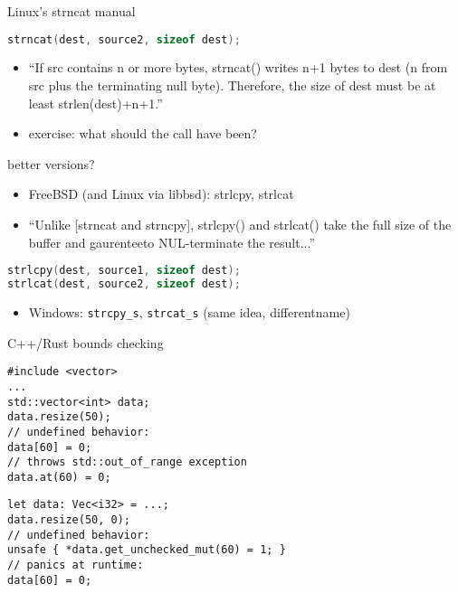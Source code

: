 \begin{frame}[fragile,label=strncatManual]{Linux's strncat manual}
\begin{lstlisting}[language=C,style=smaller]
strncat(dest, source2, sizeof dest);
\end{lstlisting}
\begin{itemize}
\item ``If src contains n or more bytes, strncat() writes n+1 bytes to  dest  (n
from  src  plus the terminating null byte).  Therefore, the size of dest
must be at least strlen(dest)+n+1.''
\end{itemize}
\begin{itemize}
\item exercise: what should the call have been?
\end{itemize}
\end{frame}

\begin{frame}[fragile,label=betterStrX]{better versions?}
\begin{itemize}
\item FreeBSD (and Linux via libbsd): strlcpy, strlcat
\item ``Unlike [strncat and strncpy], strlcpy() and strlcat() take the full size of the buffer
        and gaurenteeto NUL-terminate the result...''
\end{itemize}
\begin{lstlisting}[language=C++,style=smaller]
strlcpy(dest, source1, sizeof dest);
strlcat(dest, source2, sizeof dest);
\end{lstlisting}
\vspace{.5cm}
\begin{itemize}
\item Windows: \texttt{strcpy\_s}, \texttt{strcat\_s} (same idea, differentname)
\end{itemize}
\end{frame}

\begin{frame}[fragile,label=cppBounds]{C++/Rust bounds checking}
\lstset{language=C,style=small}
\begin{lstlisting}
#include <vector>
...
std::vector<int> data;
data.resize(50);
// undefined behavior:
data[60] = 0;
// throws std::out_of_range exception
data.at(60) = 0;
\end{lstlisting}
\vspace{-\baselineskip}
\hrulefill
\begin{Verbatim}[fontsize=\small]
let data: Vec<i32> = ...;
data.resize(50, 0);
// undefined behavior:
unsafe { *data.get_unchecked_mut(60) = 1; }
// panics at runtime:
data[60] = 0;  
\end{Verbatim}
\end{frame}

